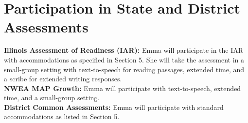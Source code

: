 \section{Participation in State and District Assessments}

\begin{iepbox}
{\bfseries\color{IEPNavy} Illinois Assessment of Readiness (IAR):} Emma will participate in the IAR with accommodations as specified in Section 5. She will take the assessment in a small-group setting with text-to-speech for reading passages, extended time, and a scribe for extended writing responses.\\[4pt]
{\bfseries\color{IEPNavy} NWEA MAP Growth:} Emma will participate with text-to-speech, extended time, and a small-group setting.\\[4pt]
{\bfseries\color{IEPNavy} District Common Assessments:} Emma will participate with standard accommodations as listed in Section 5.
\end{iepbox}

\vspace{8pt}
